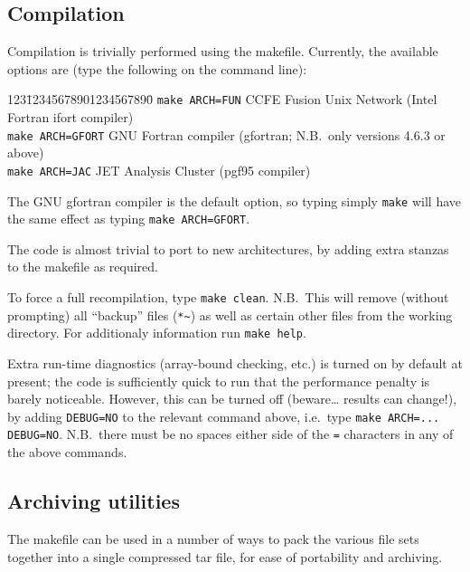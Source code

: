 \subsection{Compilation}

Compilation is trivially performed using the makefile. Currently, the
available options are (type the following on the command line):
\begin{tabbing}
123\=12345678901234567890\= \kill
\> \texttt{make ARCH=FUN} \> CCFE Fusion Unix Network (Intel Fortran ifort compiler) \\
\> \texttt{make ARCH=GFORT} \> GNU Fortran compiler (gfortran; N.B.\ only versions
4.6.3 or above) \\
\> \texttt{make ARCH=JAC} \> JET Analysis Cluster (pgf95 compiler)
\end{tabbing}
The GNU gfortran compiler is the default option, so typing simply
\texttt{make} will have the same effect as typing \texttt{make ARCH=GFORT}.

The code is almost trivial to port to new architectures, by adding extra
stanzas to the makefile as required.

To force a full recompilation, type \texttt{make clean}. N.B.\ This will
remove (without prompting) all ``backup'' files (\texttt{*\~}) as well as
certain other files from the working directory. For additionaly information
run \texttt{make help}.

Extra run-time diagnostics (array-bound checking, etc.) is turned on by
default at present; the code is sufficiently quick to run that the performance
penalty is barely noticeable. However, this can be turned off (beware\ldots
results can change!), by adding \texttt{DEBUG=NO} to the relevant command
above, i.e.\ type \verb+make ARCH=... DEBUG=NO+.  N.B.\ there must be no
spaces either side of the \texttt{=} characters in any of the above commands.

\subsection{Archiving utilities}

The makefile can be used in a number of ways to pack the various file sets
together into a single compressed tar file, for ease of portability and
archiving.

